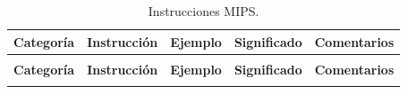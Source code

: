 \documentclass[12pt,a4paper]{article}
\begin{document}
		\small
		\begin{xltabular}{\textwidth}{>{\raggedright\arraybackslash}p{2.2cm} >{\raggedright\arraybackslash}p{2.2cm} >{\raggedright\arraybackslash}p{3cm} >{\raggedright\arraybackslash}p{3.5cm} X}
			\caption{Instrucciones MIPS.}\\
			\toprule
			\textbf{Categoría} & \textbf{Instrucción} & \textbf{Ejemplo} & \textbf{Significado} & \textbf{Comentarios} \\
			\midrule
			\endfirsthead %
			
			 \\
			\toprule
			\textbf{Categoría} & \textbf{Instrucción} & \textbf{Ejemplo} & \textbf{Significado} & \textbf{Comentarios} \\
			\midrule
			\endhead %
			
			\bottomrule
			\endfoot %
			
			\bottomrule
			\endlastfoot %
			

\end{xltabular}
\end{document}
